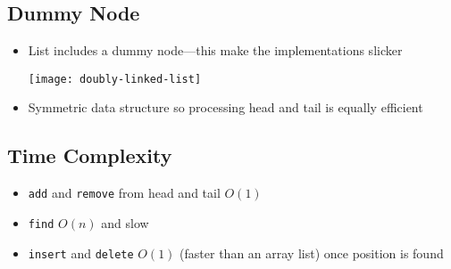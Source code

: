 
\begin{slide}
\section{Dummy Node}

\begin{PauseHighLight}
  \begin{itemize}
  \item List includes a dummy node\pause---this make the
    implementations slicker\pause
    \begin{center}
      \texttt{[image: doubly-linked-list]}\pause
    \end{center}
  \item Symmetric data structure so processing head and tail is equally
    efficient\pause
  \end{itemize}
\end{PauseHighLight}
\end{slide}



\begin{slide}
\section{Time Complexity}

\pausebuild
\color{TwoColor}
\begin{itemize}
\item \texttt{add} and \texttt{remove} from head and tail $O(1)$\pauseh
\item \texttt{find} $O(n)$ and slow\pauseh
\item \texttt{insert} and \texttt{delete} $O(1)$ (faster than an array
  list) once position is found\pauseh
\end{itemize}\color{TextColor}
\begin{center}
  \pause
\end{center}
\end{slide}


\Outline




